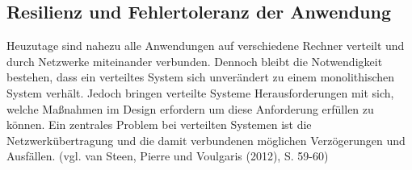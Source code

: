 \subsection{Resilienz und Fehlertoleranz der Anwendung}
Heuzutage sind nahezu alle Anwendungen auf verschiedene Rechner verteilt und durch Netzwerke miteinander verbunden. Dennoch bleibt die Notwendigkeit bestehen, dass ein verteiltes System sich unverändert zu einem monolithischen System verhält. Jedoch bringen verteilte Systeme Herausforderungen mit sich, welche Maßnahmen im Design erfordern um diese Anforderung erfüllen zu können. Ein zentrales Problem bei verteilten Systemen ist die Netzwerkübertragung und die damit verbundenen möglichen Verzögerungen und Ausfällen. (vgl. van Steen, Pierre und Voulgaris (2012), S. 59-60)